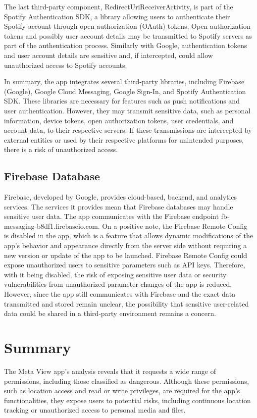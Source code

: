 The last third-party component, RedirectUriReceiverActivity, is part of the Spotify Authentication SDK, a library allowing users to authenticate their Spotify account through open authorization (OAuth) tokens. Open authorization tokens and possibly user account details may be transmitted to Spotify servers as part of the authentication process. Similarly with Google, authentication tokens and user account details are sensitive and, if intercepted, could allow unauthorized access to Spotify accounts. 

In summary, the app integrates several third-party libraries, including Firebase (Google), Google Cloud Messaging, Google Sign-In, and Spotify Authentication SDK. These libraries are necessary for features such as push notifications and user authentication. However, they may transmit sensitive data, such as personal information, device tokens, open authorization tokens, user credentials, and account data, to their respective servers. If these transmissions are intercepted by external entities or used by their respective platforms for unintended purposes, there is a risk of unauthorized access.


\subsection*{Firebase Database}
Firebase, developed by Google, provides cloud-based, backend, and analytics services. The services it provides mean that Firebase databases may handle sensitive user data. The app communicates with the Firebase endpoint fb-messaging-b8df1.firebaseio.com. On a positive note, the Firebase Remote Config is disabled in the app, which is a feature that allows dynamic modifications of the app's behavior and appearance directly from the server side without requiring a new version or update of the app to be launched. Firebase Remote Config could expose unauthorized users to sensitive parameters such as API keys. Therefore, with it being disabled, the risk of exposing sensitive user data or security vulnerabilities from unauthorized parameter changes of the app is reduced. However, since the app still communicates with Firebase and the exact data transmitted and stored remain unclear, the possibility that sensitive user-related data could be shared in a third-party environment remains a concern.

\section{Summary}
The Meta View app's analysis reveals that it requests a wide range of permissions, including those classified as dangerous. Although these permissions, such as location access and read or write privileges, are required for the app's functionalities, they expose users to potential risks, including continuous location tracking or unauthorized access to personal media and files.

